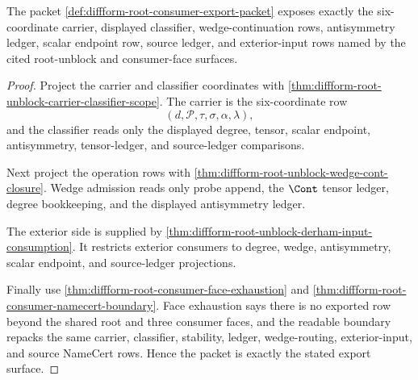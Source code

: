 \begin{theorem}
\label{thm:diffform-root-consumer-export-exactness}
The packet
\autoref{def:diffform-root-consumer-export-packet} exposes exactly the
six-coordinate carrier, displayed classifier, wedge-continuation rows,
antisymmetry ledger, scalar endpoint row, source ledger, and exterior-input
rows named by the cited root-unblock and consumer-face surfaces.
\end{theorem}
\begin{proof}
Project the carrier and classifier coordinates with
\autoref{thm:diffform-root-unblock-carrier-classifier-scope}. The carrier is
the six-coordinate row
$$
(d,\mathcal{P},\tau,\sigma,\alpha,\lambda),
$$
and the classifier reads only the displayed degree, tensor, scalar endpoint,
antisymmetry, tensor-ledger, and source-ledger comparisons.

Next project the operation rows with
\autoref{thm:diffform-root-unblock-wedge-cont-closure}. Wedge admission reads
only probe append, the $\Cont$ tensor ledger, degree bookkeeping, and the
displayed antisymmetry ledger.

The exterior side is supplied by
\autoref{thm:diffform-root-unblock-derham-input-consumption}. It restricts
exterior consumers to degree, wedge, antisymmetry, scalar endpoint, and
source-ledger projections.

Finally use
\autoref{thm:diffform-root-consumer-face-exhaustion} and
\autoref{thm:diffform-root-consumer-namecert-boundary}. Face exhaustion says
there is no exported row beyond the shared root and three consumer faces, and
the readable boundary repacks the same carrier, classifier, stability, ledger,
wedge-routing, exterior-input, and source NameCert rows. Hence the packet is
exactly the stated export surface.
\end{proof}

